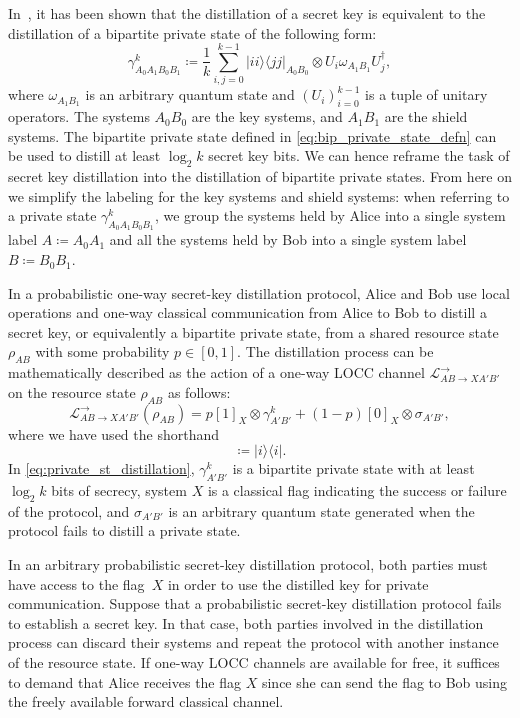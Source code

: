 \documentclass[twocolumn,letterpaper, dvipsnames,allowtoday, accepted = 2025-12-31]{quantumarticle}
\begin{document}
In~\cite{HHHO05, HHHO09}, it has been shown that the distillation of a secret key is equivalent to the distillation of a bipartite private state of the following form:
\begin{equation}\label{eq:bip_private_state_defn}
    \gamma^k_{A_0A_1B_0B_1} \coloneqq \frac{1}{k}\sum_{i,j=0}^{k-1} |ii\rangle\!\langle jj|_{A_0B_0}\otimes U_i\omega_{A_1B_1}U_j^{\dagger},
\end{equation}
where $\omega_{A_1B_1}$ is an arbitrary quantum state and $\left(U_i\right)_{i=0}^{k-1}$ is a tuple of unitary operators. The systems $A_0B_0$ are the key systems, and $A_1B_1$ are the shield systems. The bipartite private state defined in \eqref{eq:bip_private_state_defn} can be used to distill at least $\log_2 k$ secret key bits. We can hence reframe the task of secret key distillation into the distillation of bipartite private states. From here on we simplify the labeling for the key systems and shield systems: when referring to a private state $\gamma^k_{A_0A_1B_0B_1}$, we group the systems held by Alice into a single system label $A\coloneqq A_0A_1$ and all the systems held by Bob into a single system label $B\coloneqq B_0B_1$.

In a probabilistic one-way secret-key distillation protocol, Alice and Bob use local operations and one-way classical communication from Alice to Bob to distill a secret key, or equivalently a bipartite private state, from a shared resource state $\rho_{AB}$ with some probability $p\in [0,1]$. The distillation process can be mathematically described as the action of a one-way LOCC channel $\mathcal{L}^{\to}_{AB\to XA'B'}$ on the resource state $\rho_{AB}$ as follows:
\begin{equation}\label{eq:private_st_distillation}
    \mathcal{L}^{\to}_{AB\to XA'B'}\!\left(\rho_{AB}\right) = p[1]_X\otimes \gamma^k_{A'B'} + (1-p)[0]_X\otimes \sigma_{A'B'},
\end{equation}
where we have used the shorthand
\begin{equation}
[i]\coloneqq |i\rangle\!\langle i|.    
\end{equation}
In \eqref{eq:private_st_distillation}, $\gamma^k_{A'B'}$ is a bipartite private state with at least $\log_2 k$ bits of secrecy, system $X$ is a classical flag indicating the success or failure of the protocol, and $\sigma_{A'B'}$ is an arbitrary quantum state generated when the protocol fails to distill a private state.  

In an arbitrary probabilistic secret-key distillation protocol, both parties must have access to the flag~$X$ in order to use the distilled key for private communication. Suppose that a probabilistic secret-key distillation protocol fails to establish a secret key. In that case, both parties involved in the distillation process can discard their systems and repeat the protocol with another instance of the resource state. If one-way LOCC channels are available for free, it suffices to demand that Alice receives the flag $X$ since she can send the flag to Bob using the freely available forward classical channel.
\end{document}
